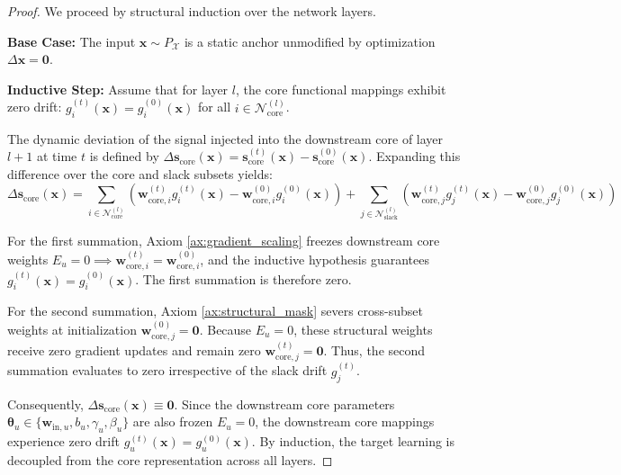\documentclass[11pt, a4paper, copyright, gdm]{google}
\newcommand{\sVect}{\boldsymbol{s}}
\newcommand{\wVect}{\boldsymbol{w}}
\newcommand{\xVect}{\boldsymbol{x}}
\newcommand{\zeroVect}{\boldsymbol{0}}
\newcommand{\thetaVect}{\boldsymbol{\theta}}
\newcommand{\calN}{\mathcal{N}}
\newcommand{\calX}{\mathcal{X}}
\theoremstyle{definition}
\begin{document}
\begin{proof}
We proceed by structural induction over the network layers.

\textbf{Base Case:} The input $\xVect \sim P_\calX$ is a static anchor unmodified by optimization $\Delta \xVect = \zeroVect$.

\textbf{Inductive Step:} Assume that for layer $l$, the core functional mappings exhibit zero drift: $g_i^{(t)}(\xVect) = g_i^{(0)}(\xVect)$ for all $i \in \calN_{\text{core}}^{(l)}$. 

The dynamic deviation of the signal injected into the downstream core of layer $l+1$ at time $t$ is defined by $\Delta \sVect_{\text{core}}(\xVect) = \sVect_{\text{core}}^{(t)}(\xVect) - \sVect_{\text{core}}^{(0)}(\xVect)$. Expanding this difference over the core and slack subsets yields:
\begin{equation}
\Delta \sVect_{\text{core}}(\xVect) = \sum_{i \in \calN_{\text{core}}^{(l)}} \left( \wVect_{\text{core},i}^{(t)} g_i^{(t)}(\xVect) - \wVect_{\text{core},i}^{(0)} g_i^{(0)}(\xVect) \right) + \sum_{j \in \calN_{\text{slack}}^{(l)}} \left( \wVect_{\text{core},j}^{(t)} g_j^{(t)}(\xVect) - \wVect_{\text{core},j}^{(0)} g_j^{(0)}(\xVect) \right)
\end{equation}

For the first summation, Axiom \ref{ax:gradient_scaling} freezes downstream core weights $E_u = 0 \implies \wVect_{\text{core},i}^{(t)} = \wVect_{\text{core},i}^{(0)}$, and the inductive hypothesis guarantees $g_i^{(t)}(\xVect) = g_i^{(0)}(\xVect)$. The first summation is therefore zero. 

For the second summation, Axiom \ref{ax:structural_mask} severs cross-subset weights at initialization $\wVect_{\text{core},j}^{(0)} = \zeroVect$. Because $E_u = 0$, these structural weights receive zero gradient updates and remain zero $\wVect_{\text{core},j}^{(t)} = \zeroVect$. Thus, the second summation evaluates to zero irrespective of the slack drift $g_j^{(t)}$.

Consequently, $\Delta \sVect_{\text{core}}(\xVect) \equiv \zeroVect$. Since the downstream core parameters $\thetaVect_u \in \{\wVect_{\text{in},u}, b_u, \gamma_u, \beta_u\}$ are also frozen $E_u = 0$, the downstream core mappings experience zero drift $g_u^{(t)}(\xVect) = g_u^{(0)}(\xVect)$. By induction, the target learning is decoupled from the core representation across all layers.
\end{proof}
\end{document}
